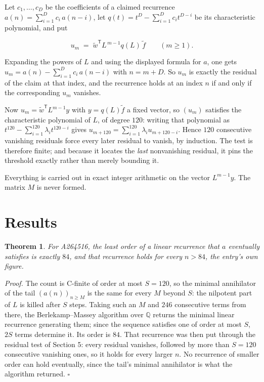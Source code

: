 \documentclass[11pt]{article}
\newtheorem{theorem}{Theorem}
\theoremstyle{definition}
\begin{document}
Let $c_1,\dots,c_D$ be the coefficients of a claimed recurrence $a(n) = \sum_{i=1}^{D} c_i\,a(n-i)$, let $q(t) = t^{D} - \sum_{i=1}^{D} c_i t^{D-i}$ be its characteristic polynomial, and put

\[u_m \;=\; \tilde w^{\mathsf T} L^{\,m-1} q(L)\,\tilde f \qquad (m \ge 1).\]

Expanding the powers of $L$ and using the displayed formula for $a$, one gets $u_m = a(n) - \sum_{i=1}^{D} c_i\,a(n-i)$ with $n = m + D$. So $u_m$ is exactly the residual of the claim at that index, and the recurrence holds at an index $n$ if and only if the corresponding $u_m$ vanishes.

Now $u_m = \tilde w^{\mathsf T} L^{m-1} y$ with $y = q(L)\tilde f$ a fixed vector, so $(u_m)$ satisfies the characteristic polynomial of $L$, of degree $120$: writing that polynomial as $t^{120} - \sum_{i=1}^{120} \lambda_i t^{120-i}$ gives $u_{m+120} = \sum_{i=1}^{120} \lambda_i u_{m+120-i}$. Hence $120$ consecutive vanishing residuals force every later residual to vanish, by induction. The test is therefore finite; and because it locates the {\itshape last} nonvanishing residual, it pins the threshold exactly rather than merely bounding it.

Everything is carried out in exact integer arithmetic on the vector $L^{m-1}y$. The matrix $M$ is never formed.

\section{Results}

\begin{theorem} For A264516, the least order of a linear recurrence that $a$ eventually satisfies is exactly $84$, and that recurrence holds for every $n > 84$, the entry's own figure.\end{theorem}

{\itshape Proof.} The count is C-finite of order at most $S = 120$, so the minimal annihilator of the tail $(a(n))_{n \ge M}$ is the same for every $M$ beyond $S$: the nilpotent part of $L$ is killed after $S$ steps. Taking such an $M$ and $246$ consecutive terms from there, the Berlekamp--Massey algorithm over $\mathbb{Q}$ returns the minimal linear recurrence generating them; since the sequence satisfies one of order at most $S$, $2S$ terms determine it. Its order is $84$. That recurrence was then put through the residual test of Section 5: every residual vanishes, followed by more than $S = 120$ consecutive vanishing ones, so it holds for every larger $n$. No recurrence of smaller order can hold eventually, since the tail's minimal annihilator is what the algorithm returned. $\square$
\end{document}
